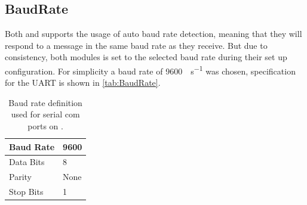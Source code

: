 \subsection{BaudRate}
Both \SARA and \GPS supports the usage of auto baud rate detection, meaning that they will respond to a message in the same baud rate as they receive.
But due to consistency, both modules is set to the selected baud rate during their set up configuration. 
For simplicity a baud rate of \SI[per-mode = symbol]{9600}{\bit\per\second} was chosen, specification for the UART is shown in \vref{tab:BaudRate}.

\begin{table}[H]
	\begin{tabular}{ll}
		\hline 
		Baud Rate & 9600 \\ 
		\hline 
		Data Bits & 8 \\ 
		\hline 
		Parity & None \\ 
		\hline 
		Stop Bits & 1 \\ 
		\hline 
	\end{tabular}
	\centering
	\caption{Baud rate definition used for serial com ports on \SAMD.}
	\label{tab:BaudRate}
\end{table} 

\FloatBarrier